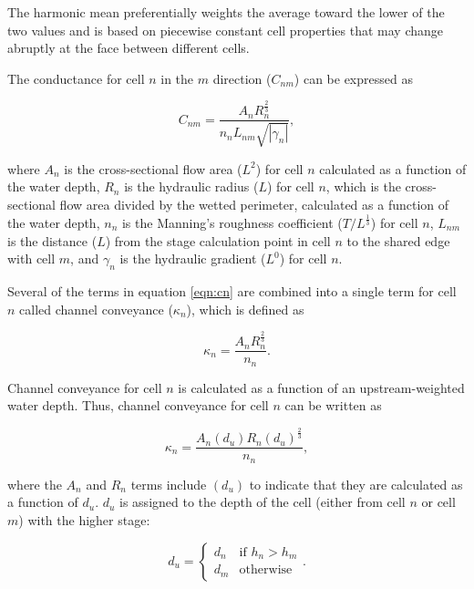 \documentclass[fleqn]{article}
\begin{document}
\noindent The harmonic mean preferentially weights the average toward the lower of the two values and is based on piecewise constant cell properties that may change abruptly at the face between different cells.

The conductance for cell $n$ in the $m$ direction ($C_{nm}$) can be expressed as

\begin{equation}
  C_{nm} = 
  \frac{
  A_n 
  R_{n}^{\frac{2}{3}}
  }
  {n_n
  L_{nm}
  \sqrt{| \gamma_n |}
  },
\label{eqn:cn}
\end{equation}

\noindent where $A_n$ is the cross-sectional flow area ($L^2$) for cell $n$ calculated as a function of the water depth, $R_n$ is the hydraulic radius ($L$) for cell $n$, which is the cross-sectional flow area divided by the wetted perimeter, calculated as a function of the water depth, $n_n$ is the Manning's roughness coefficient ($T/L^{\frac{1}{3}}$) for cell $n$, $L_{nm}$ is the distance ($L$) from the stage calculation point in cell $n$ to the shared edge with cell $m$, and $\gamma_n$ is the hydraulic gradient ($L^0$) for cell $n$.

Several of the terms in equation \ref{eqn:cn} are combined into a single term for cell $n$ called channel conveyance ($\kappa_n$), which is defined as

\begin{equation}
  \kappa_n = \frac{A_n R_n^{\frac{2}{3}}}{n_n}.
\label{eqn:conveyance}
\end{equation}

\noindent Channel conveyance for cell $n$ is calculated as a function of an upstream-weighted water depth.  Thus, channel conveyance for cell $n$ can be written as

\begin{equation}
  \kappa_n = \frac{A_n (d_u) R_n (d_u) ^{\frac{2}{3}}}{n_n},
\label{eqn:conveyancedu}
\end{equation}

\noindent where the $A_n$ and $R_n$ terms include $(d_u)$ to indicate that they are calculated as a function of $d_u$.  $d_u$ is assigned to the depth of the cell (either from cell $n$ or cell $m$) with the higher stage:

\[
d_u = 
\begin{cases}
  d_n & \text{if $h_n>h_m$} \\
  d_m & \text{otherwise}
\end{cases}.
\]
\end{document}
